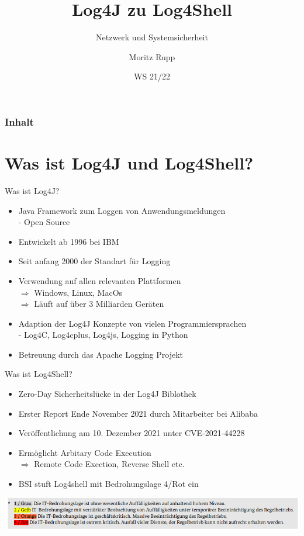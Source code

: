 \documentclass{beamer}
\title[Netzwerk und Systemsicherheit]{Log4J zu Log4Shell}
\subtitle{Netzwerk und Systemsicherheit}
\author{Moritz Rupp}
\institute[MR]{Hochschule Albstadt-Sigmaringen}
\date{WS 21/22}
\begin{document}
\begin{frame}
\titlepage
\end{frame}
\begin{frame}
\frametitle{Inhalt}
\tableofcontents    
\end{frame}
\section{Was ist Log4J und Log4Shell?}
\begin{frame}{Was ist Log4J?}
\begin{itemize}
 \item Java Framework zum Loggen von Anwendungsmeldungen\\
 - Open Source
 \item Entwickelt ab 1996 bei IBM
 \item Seit anfang 2000 der Standart für Logging\\
 \item Verwendung auf allen relevanten Plattformen\\
 $\Rightarrow$ Windows, Linux, MacOs\\
 $\Rightarrow$ Läuft auf über 3 Milliarden Geräten
 \item Adaption der Log4J Konzepte von vielen Programmiersprachen\\
 - Log4C, Log4cplus, Log4js, Logging in Python 
 \item Betreuung durch das Apache Logging Projekt
\end{itemize}
\end{frame}
\begin{frame}{Was ist Log4Shell?}
\begin{itemize}
\item Zero-Day Sicherheitslücke in der Log4J Biblothek
\item Erster Report Ende November 2021 durch Mitarbeiter bei Alibaba 
\item Veröffentlichung am 10. Dezember 2021 unter CVE-2021-44228
\item Ermöglicht Arbitary Code Execution\\
$\Rightarrow$ Remote Code Exection, Reverse Shell etc.
\item BSI stuft Log4shell mit Bedrohungslage 4/Rot ein

\end{itemize}
\begin{center}
 \includegraphics[scale=0.35]{bsilog4j.png}
\end{center}


 
\end{frame}
\end{document}
